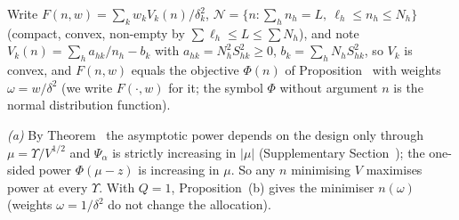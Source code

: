 Write $F(n,w)=\sum_kw_kV_k(n)/\delta_k^2$, $\mathcal N=\{n:\sum_hn_h=L,\ \ell_h\le n_h\le N_h\}$ (compact, convex, non-empty by $\sum\ell_h\le L\le\sum N_h$), and note $V_k(n)=\sum_ha_{hk}/n_h-b_k$ with $a_{hk}=N_h^2S^2_{hk}\ge0$, $b_k=\sum_hN_hS^2_{hk}$, so $V_k$ is convex, and $F(n,w)$ equals the objective $\Phi(n)$ of Proposition~ with weights $\omega=w/\delta^2$ (we write $F(\cdot,w)$ for it; the symbol $\Phi$ without argument $n$ is the normal distribution function).

\emph{(a)} By Theorem~ the asymptotic power depends on the design only through $\mu=\Upsilon/V^{1/2}$ and $\Psi_\alpha$ is strictly increasing in $|\mu|$ (Supplementary Section~); the one-sided power $\Phi(\mu-z)$ is increasing in $\mu$. So any $n$ minimising $V$ maximises power at every $\Upsilon$. With $Q=1$, Proposition~(b) gives the minimiser $n(\omega)$ (weights $\omega=1/\delta^2$ do not change the allocation).

